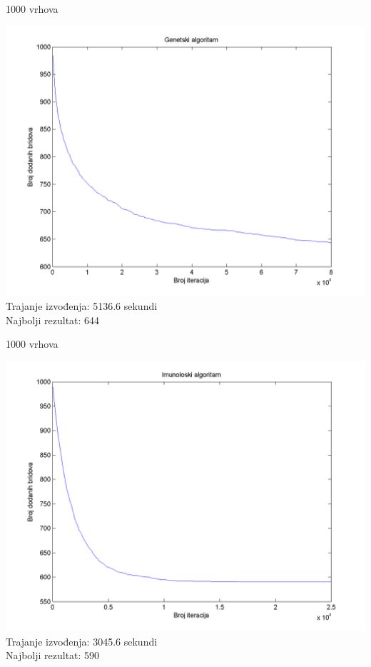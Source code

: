 \documentclass{beamer}
\begin{document}
\begin{frame}{1000 vrhova}
\begin{center}
\includegraphics[scale = 0.4]{Gen1000.png}\\
Trajanje izvođenja: 5136.6 sekundi\\
Najbolji rezultat: 644\\
\end{center}
\end{frame}

\begin{frame}{1000 vrhova}
\begin{center}
\includegraphics[scale = 0.4]{Im1000.png}\\
Trajanje izvođenja: 3045.6 sekundi\\
Najbolji rezultat: 590\\
\end{center}
\end{frame}
\end{document}

